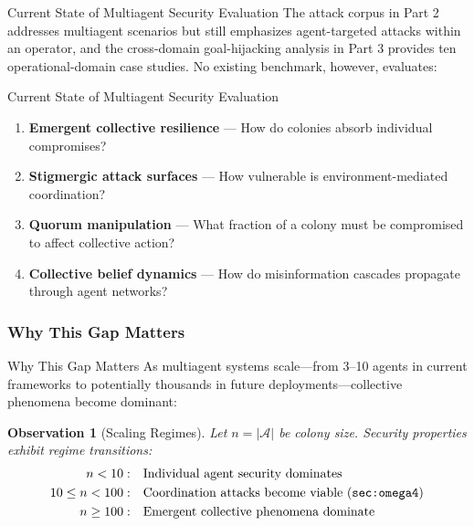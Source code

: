\documentclass[
  ignorenonframetext,
]{beamer}
\providecommand{\tightlist}{%
  \setlength{\itemsep}{0pt}\setlength{\parskip}{0pt}}
\providecommand{\cref}[1]{\texttt{\detokenize{#1}}}
\newtheorem{observation}{Observation}
\begin{document}
\begin{frame}[allowframebreaks]{Current State of Multiagent Security
Evaluation}
The attack corpus in Part 2 addresses multiagent scenarios but still
emphasizes agent-targeted attacks within an operator, and the
cross-domain goal-hijacking analysis in Part 3
\cite{friedman2026cogsec3} provides ten operational-domain case studies.
No existing benchmark, however, evaluates:

\end{frame}

\begin{frame}[allowframebreaks]{Current State of Multiagent Security
Evaluation}
\begin{enumerate}
\tightlist
\item
  \textbf{Emergent collective resilience} --- How do colonies absorb
  individual compromises?
\item
  \textbf{Stigmergic attack surfaces} --- How vulnerable is
  environment-mediated coordination?
\item
  \textbf{Quorum manipulation} --- What fraction of a colony must be
  compromised to affect collective action?
\item
  \textbf{Collective belief dynamics} --- How do misinformation cascades
  propagate through agent networks?
\end{enumerate}
\end{frame}

\subsubsection{Why This Gap Matters}\label{sec:gap-significance}

\begin{frame}[allowframebreaks]{Why This Gap Matters}
As multiagent systems scale---from 3--10 agents in current frameworks to
potentially thousands in future deployments---collective phenomena
become dominant:

\begin{observation}[Scaling Regimes]
\label{obs:scaling-regimes}
Let $n = |\mathcal{A}|$ be colony size. Security properties exhibit regime transitions:
\begin{align}
n < 10: &\quad \text{Individual agent security dominates} \\
10 \leq n < 100: &\quad \text{Coordination attacks become viable (\cref{sec:omega4})} \\
n \geq 100: &\quad \text{Emergent collective phenomena dominate}
\end{align}
\end{observation}

\end{frame}
\end{document}
